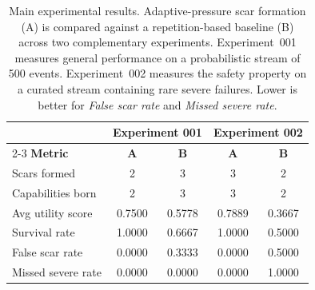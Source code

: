 \begin{table}[t]
\centering
\caption{%
Main experimental results.
Adaptive-pressure scar formation (A) is compared against a
repetition-based baseline (B) across two complementary experiments.
Experiment~001 measures general performance on a probabilistic stream
of 500 events. Experiment~002 measures the safety property on a curated
stream containing rare severe failures.
Lower is better for \textit{False scar rate} and \textit{Missed severe rate}.
}
\label{tab:main_results}
\small
\begin{tabular}{lcccc}
\hline
 & \multicolumn{2}{c}{\textbf{Experiment 001}} & \multicolumn{2}{c}{\textbf{Experiment 002}} \\
\cline{2-3} \cline{4-5}
\textbf{Metric} & \textbf{A} & \textbf{B} & \textbf{A} & \textbf{B} \\
\hline
Scars formed            & 2      & 3      & 3      & 2      \\
Capabilities born       & 2      & 3      & 3      & 2      \\
Avg utility score       & 0.7500 & 0.5778 & 0.7889 & 0.3667 \\
Survival rate           & 1.0000 & 0.6667 & 1.0000 & 0.5000 \\
False scar rate         & 0.0000 & 0.3333 & 0.0000 & 0.5000 \\
Missed severe rate      & 0.0000 & 0.0000 & 0.0000 & 1.0000 \\
\hline
\end{tabular}
\end{table}
